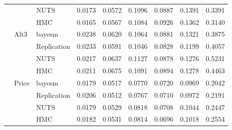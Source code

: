 \begin{tabular}{lllcccccc}
 &  & NUTS & 0.0173 & 0.0572 & 0.1096 & 0.0887 & 0.1391 & 0.3391 \\
 &  & HMC & 0.0165 & 0.0567 & 0.1084 & 0.0926 & 0.1362 & 0.3140 \\
 & Alt3 & bayesm & 0.0238 & 0.0620 & 0.1064 & 0.0881 & 0.1321 & 0.3875 \\
 &  & Replication & 0.0233 & 0.0591 & 0.1046 & 0.0828 & 0.1199 & 0.4057 \\
 &  & NUTS & 0.0217 & 0.0637 & 0.1127 & 0.0878 & 0.1276 & 0.5231 \\
 &  & HMC & 0.0211 & 0.0675 & 0.1091 & 0.0894 & 0.1278 & 0.4463 \\
 & Price & bayesm & 0.0179 & 0.0517 & 0.0770 & 0.0720 & 0.0969 & 0.2042 \\
 &  & Replication & 0.0206 & 0.0512 & 0.0767 & 0.0710 & 0.0972 & 0.2191 \\
 &  & NUTS & 0.0179 & 0.0529 & 0.0818 & 0.0708 & 0.1044 & 0.2447 \\
 &  & HMC & 0.0182 & 0.0531 & 0.0814 & 0.0696 & 0.1018 & 0.2554 \\
\bottomrule
\end{tabular}
